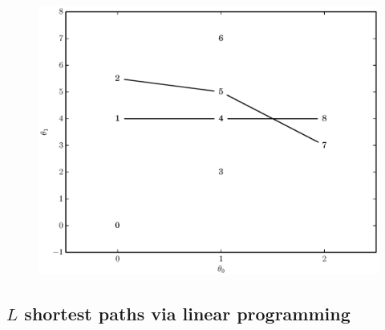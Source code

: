 \begin{figure}[!t]
    \centering
    \includegraphics[width=\figwidthscale\textwidth]{plots/small_graph_ex_greedy_paths.eps}
    \CaptionWithTitle{%
    }{\label{plot:simple_graph_greedy_paths}}
\end{figure}

\subsection{$L$ shortest paths via linear programming}

